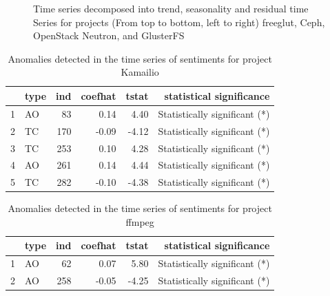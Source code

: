 \documentclass[12pt]{report}
\begin{document}
\begin{figure}[!htbp]
\caption{Time series decomposed into trend, seasonality and residual time Series for projects (From top to bottom, left to right) freeglut, Ceph, OpenStack Neutron, and GlusterFS}
\label{figureDecpmposed_9to12}
\end{figure}



\begin{table}
\centering
\caption{Anomalies detected in the time series of sentiments for project Kamailio}
\label{TableDiversityMeasuresKunegisEtAl}
\begin{tabular}{rlrrrr}
  \hline
 & type & ind & coefhat & tstat & statistical significance \\ 
  \hline
  1 & AO &  83 & 0.14 & 4.40 & Statistically significant (*) \\ 
  2 & TC & 170 & -0.09 & -4.12 & Statistically significant (*)\\ 
  3 & TC & 253 & 0.10 & 4.28  & Statistically significant (*)\\ 
  4 & AO & 261 & 0.14 & 4.44  & Statistically significant (*)\\ 
  5 & TC & 282 & -0.10 & -4.38 &  Statistically significant (*) \\ 
   \hline
\end{tabular}
\end{table}


\begin{table}
\centering
\caption{Anomalies detected in the time series of sentiments for project ffmpeg}
\begin{tabular}{rlrrrr}
  \hline
 & type & ind & coefhat & tstat & statistical significance\\ 
  \hline
1 & AO &  62 & 0.07 & 5.80 & Statistically significant (*) \\ 
  2 & AO & 258 & -0.05 & -4.25 & Statistically significant (*) \\ 
   \hline
\end{tabular}
\end{table}
\end{document}
